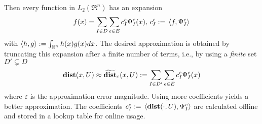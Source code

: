 Then every function in $L_2(\Re^n)$ has an expansion 
\[f(x) = \sum_{I \in D} \sum_{e \in E} c_I^e \Psi^e_I(x), \, c_I^e :=\, \langle f,\Psi^e_I \rangle\]
with $\langle h,g \rangle := \int_{\mathbb{R}^n}h(x)g(x)dx$.
The desired approximation is obtained by truncating this expansion after a finite number of terms, i.e., by using  a \textit{finite} set $D' \subsetneq D$
\begin{equation}
\mathbf{dist}(x,U) \approx \widetilde{\mathbf{dist}}_\varepsilon(x,U) := \sum_{I \in D'} \sum_{e \in E} c_I^e \Psi^e_I(x)
\end{equation}
where $\varepsilon$ is the approximation error magnitude.
Using more coefficients yields a better approximation.
The coefficients $c_I^e :=\, \langle \mathbf{dist}(\cdot, U), \Psi^e_I \rangle$ are calculated offline and stored in a lookup table for online usage.






